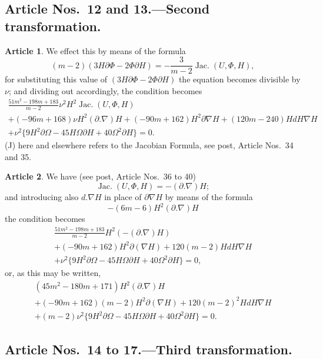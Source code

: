 \documentclass[11pt,a4paper]{article}
\theoremstyle{definition}
\newtheorem{art}{Article}[section]
\DeclareMathOperator{\Jac}{Jac.}
\begin{document}
\subsection*{Article Nos.\ 12 and 13.---Second transformation.}

\setcounter{art}{11}
\begin{art}
We effect this by means of the formula
\[
(m-2)(3H \partial \Phi - 2\Phi \partial H) = -\frac{3}{m-2} \Jac(U, \Phi, H),
\tag{J}
\]
for substituting this value of $(3H \partial \Phi - 2\Phi \partial H)$ the equation becomes
divisible by $\nu$; and dividing out accordingly, the condition becomes
\begin{multline*}
\frac{51m^2 - 198m + 183}{m-2} \nu^2 H^2 \Jac(U, \Phi, H) \\
+ (-96m + 168) \nu H^2 (\partial . \nabla)H + (-90m + 162) H^2 \partial \nabla H
+ (120m - 240) H dH \nabla H \\
+ \nu^2 \bigl\{9H^2 \partial \Omega - 45H\Omega \partial H + 40\Omega^2 \partial H\bigr\} = 0.
\end{multline*}
(J) here and elsewhere refers to the Jacobian Formula, see post, Article Nos.\ 34 and 35.
\end{art}

\begin{art}
We have (see post, Article Nos.\ 36 to 40)
\[
\Jac(U, \Phi, H) = -(\partial . \nabla)H;
\]
and introducing also $d.\nabla H$ in place of $\partial \nabla H$ by means of the formula
\[
-(6m-6)H^2 (\partial . \nabla)H
\]
the condition becomes
\begin{multline*}
\frac{51m^2 - 198m + 183}{m-2} H^2 (-(\partial . \nabla)H) \\
+ (-90m + 162) H^2 \partial (\nabla H) + 120(m-2) H dH \nabla H \\
+ \nu^2 \bigl\{9H^2 \partial \Omega - 45H\Omega \partial H + 40\Omega^2 \partial H\bigr\} = 0,
\end{multline*}
or, as this may be written,
\begin{multline*}
(45m^2 - 180m + 171) H^2 (\partial . \nabla)H \\
+ (-90m + 162)(m-2) H^2 \partial (\nabla H) + 120(m-2)^2 H dH \nabla H \\
+ (m-2) \nu^2 \bigl\{9H^2 \partial \Omega - 45H\Omega \partial H + 40\Omega^2 \partial H\bigr\} = 0.
\end{multline*}
\end{art}

\subsection*{Article Nos.\ 14 to 17.---Third transformation.}
\end{document}
